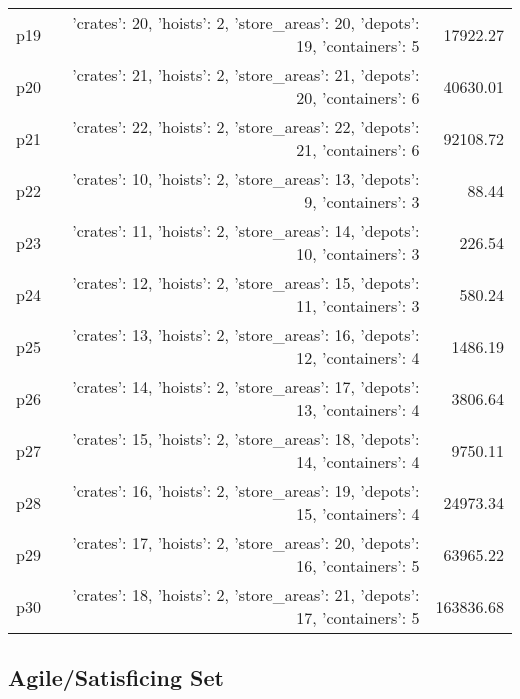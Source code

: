 \documentclass{article}
\begin{document}
\begin{center}
\begin{tabular}{@{}l|r|r@{}}
  p19&{'crates': 20, 'hoists': 2, 'store\_areas': 20, 'depots': 19, 'containers': 5}&17922.27\\
  p20&{'crates': 21, 'hoists': 2, 'store\_areas': 21, 'depots': 20, 'containers': 6}&40630.01\\
  p21&{'crates': 22, 'hoists': 2, 'store\_areas': 22, 'depots': 21, 'containers': 6}&92108.72\\
  p22&{'crates': 10, 'hoists': 2, 'store\_areas': 13, 'depots': 9, 'containers': 3}&88.44\\
  p23&{'crates': 11, 'hoists': 2, 'store\_areas': 14, 'depots': 10, 'containers': 3}&226.54\\
  p24&{'crates': 12, 'hoists': 2, 'store\_areas': 15, 'depots': 11, 'containers': 3}&580.24\\
  p25&{'crates': 13, 'hoists': 2, 'store\_areas': 16, 'depots': 12, 'containers': 4}&1486.19\\
  p26&{'crates': 14, 'hoists': 2, 'store\_areas': 17, 'depots': 13, 'containers': 4}&3806.64\\
  p27&{'crates': 15, 'hoists': 2, 'store\_areas': 18, 'depots': 14, 'containers': 4}&9750.11\\
  p28&{'crates': 16, 'hoists': 2, 'store\_areas': 19, 'depots': 15, 'containers': 4}&24973.34\\
  p29&{'crates': 17, 'hoists': 2, 'store\_areas': 20, 'depots': 16, 'containers': 5}&63965.22\\
  p30&{'crates': 18, 'hoists': 2, 'store\_areas': 21, 'depots': 17, 'containers': 5}&163836.68
                            \end{tabular}
                            \end{center}
                    

                                \subsection*{Agile/Satisficing Set}
                                
\end{document}
